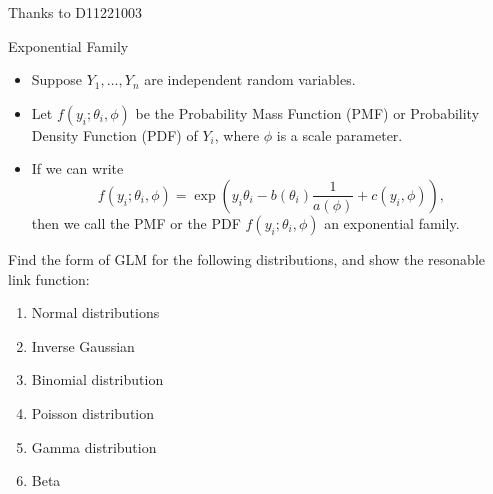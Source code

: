 \documentclass[UTF8,a4paper,10pt]{article}
\begin{document}
Thanks to D11221003


\begin{mybox}{Exponential Family}
  \begin{itemize}
      \item Suppose $Y_1, \ldots, Y_n$ are independent random variables.
      \item Let $f(y_i; \theta_i, \phi)$ be the Probability Mass Function (PMF) or Probability Density Function (PDF) of $Y_i$, where $\phi$ is a scale parameter.
      \item If we can write
      \[
      f(y_i; \theta_i, \phi) = \exp\left(y_i \theta_i - b(\theta_i) \frac{1}{a(\phi)} + c(y_i, \phi)\right),
      \]
      then we call the PMF or the PDF $f(y_i; \theta_i, \phi)$ an exponential family.
  \end{itemize}
  


\end{mybox}




  \begin{Problem}[]{}
    Find the form of GLM for the following distributions, and show the resonable link function:
    \begin{enumerate}
      \item Normal distributions
      \item Inverse Gaussian
      \item Binomial distribution
      \item Poisson distribution
      \item Gamma distribution
      \item Beta 
    \end{enumerate}
    
  \end{Problem}
\end{document}
